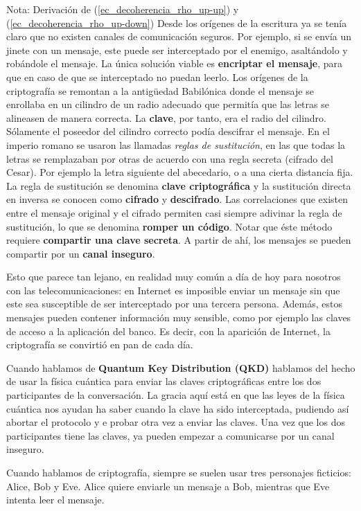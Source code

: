 \documentclass[a4paper,11pt]{book} %
\numberwithin{equation}{chapter}
\begin{document}
\begin{mybox_blue}{Nota: Derivación de (\ref{ec_decoherencia_rho_up-up}) y  (\ref{ec_decoherencia_rho_up-down})}
Desde los orígenes de la escritura ya se tenía claro que no existen canales de comunicación seguros. Por ejemplo, si se envía un jinete con un mensaje, este puede ser interceptado por el enemigo, asaltándolo y robándole el mensaje. La única solución viable es \textbf{encriptar el mensaje}, para que en caso de que se  interceptado no puedan leerlo. 
Los orígenes de la criptografía se remontan a la antigüedad Babilónica donde el mensaje se enrollaba
en un cilindro de un radio adecuado que permitía que las letras se alineasen de manera correcta. La
\textbf{clave}, por tanto, era el radio del cilindro. Sólamente el poseedor del cilindro correcto podía descifrar el
mensaje. En el imperio romano se usaron las llamadas \textit{reglas de sustitución}, en las que todas la letras se
remplazaban por otras de acuerdo con una regla secreta (cifrado del Cesar). Por ejemplo la letra siguiente
del abecedario, o a una cierta distancia fija. La regla de sustitución se denomina \textbf{clave criptográfica} y la
sustitución directa en inversa se conocen como \textbf{cifrado} y \textbf{descifrado}. Las correlaciones que existen entre el
mensaje original y el cifrado permiten casi siempre adivinar la regla de sustitución, lo que se denomina
\textbf{romper un código}. Notar que éste método requiere \textbf{compartir una clave secreta}. A partir de ahí, los
mensajes se pueden compartir por un \textbf{canal inseguro}. 

Esto que parece tan lejano, en realidad muy común a día de hoy para nosotros con las telecomunicaciones: en Internet es imposible enviar un mensaje sin que este sea susceptible de ser interceptado por una tercera persona. Además, estos mensajes pueden contener información muy sensible, como por ejemplo las claves de acceso a la aplicación del banco. Es decir, con la aparición de Internet, la criptografía se convirtió en pan de cada día. 

Cuando hablamos de \textbf{Quantum Key Distribution (QKD)} hablamos del hecho de usar la física cuántica para enviar las claves criptográficas entre los dos participantes de la conversación. La gracia aquí está en que las leyes de la física cuántica nos ayudan ha saber cuando la clave ha sido interceptada, pudiendo así abortar el protocolo y e probar otra vez a enviar las claves. Una vez que los dos participantes tiene las claves, ya pueden empezar a comunicarse por un canal inseguro.

Cuando hablamos de criptografía, siempre se suelen usar tres personajes ficticios: Alice, Bob y Eve. Alice quiere enviarle un mensaje a Bob, mientras que Eve intenta leer el mensaje. 


\end{mybox_blue}
\end{document}
